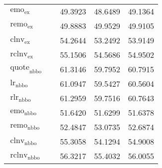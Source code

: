 \begin{table}
\begin{tabular}{llSSS}
        $\operatorname{emo}_{\mathrm{ex}}$                                                                                    &                  & 49.3923                            & 48.6489 & 49.1364 \\
        $\operatorname{remo}_{\mathrm{ex}}$                                                                                   &                  & 49.8883                            & 49.9529 & 49.9105 \\
        $\operatorname{clnv}_{\mathrm{ex}}$                                                                                   &                  & 54.2644                            & 53.2492 & 53.9149 \\
        $\operatorname{rclnv}_{\mathrm{ex}}$                                                                                  &                  & 55.1506                            & 54.5686 & 54.9502 \\\midrule
        $\operatorname{quote}_{\mathrm{nbbo}}$                                                                                &                  & 61.3146                            & 59.7952 & 60.7915 \\
        $\operatorname{lr}_{\mathrm{nbbo}}$                                                                                   &                  & 61.0947                            & 59.5427 & 60.5604 \\
        $\operatorname{rlr}_{\mathrm{nbbo}}$                                                                                  &                  & 61.2959                            & 59.7516 & 60.7643 \\
        $\operatorname{emo}_{\mathrm{nbbo}}$                                                                                  &                  & 51.6420                            & 51.6299 & 51.6378 \\
        $\operatorname{remo}_{\mathrm{nbbo}}$                                                                                 &                  & 52.4847                            & 53.0735 & 52.6874 \\
        $\operatorname{clnv}_{\mathrm{nbbo}}$                                                                                 &                  & 55.3058                            & 54.1294 & 54.9008 \\
        $\operatorname{rclnv}_{\mathrm{nbbo}}$                                                                                &                  & 56.3217                            & 55.4032 & 56.0055 \\\midrule

\end{tabular}
\end{table}
